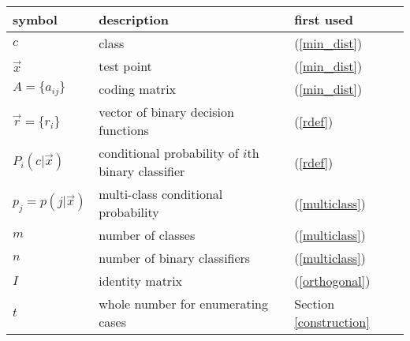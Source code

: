 \begin{tabular}{lll}
symbol & description & first used \\\hline
	$c$ & class & (\ref{min_dist}) \\
	$\vec x$ & test point & (\ref{min_dist})\\
	$A = \lbrace a_{ij} \rbrace$ & coding matrix & (\ref{min_dist})\\
	$\vec r = \lbrace r_i \rbrace$ & vector of binary decision functions & (\ref{rdef}) \\
	$P_i(c | \vec x)$ & conditional probability of $i$th binary classifier & (\ref{rdef})\\
	$p_j = p(j | \vec x)$ & multi-class conditional probability & (\ref{multiclass})\\
	$m$ & number of classes & (\ref{multiclass})\\
	$n$ & number of binary classifiers & (\ref{multiclass}) \\
	$I$ & identity matrix & (\ref{orthogonal})\\
	$t$ & whole number for enumerating cases & Section \ref{construction}
\end{tabular}

